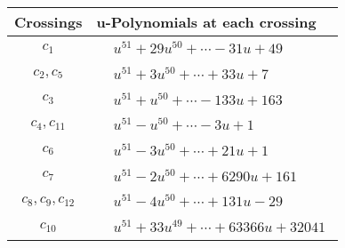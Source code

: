 \documentclass[1p]{elsarticle_modified}
\theoremstyle{definition}
\begin{document}
\begin{tabular}{m{50pt}|m{274pt}}
Crossings & \hspace{64pt}u-Polynomials at each crossing \\
\hline $$\begin{aligned}c_{1}\end{aligned}$$&$\begin{aligned}
&u^{51}+29 u^{50}+\cdots-31 u+49
\end{aligned}$\\
\hline $$\begin{aligned}c_{2},c_{5}\end{aligned}$$&$\begin{aligned}
&u^{51}+3 u^{50}+\cdots+33 u+7
\end{aligned}$\\
\hline $$\begin{aligned}c_{3}\end{aligned}$$&$\begin{aligned}
&u^{51}+u^{50}+\cdots-133 u+163
\end{aligned}$\\
\hline $$\begin{aligned}c_{4},c_{11}\end{aligned}$$&$\begin{aligned}
&u^{51}- u^{50}+\cdots-3 u+1
\end{aligned}$\\
\hline $$\begin{aligned}c_{6}\end{aligned}$$&$\begin{aligned}
&u^{51}-3 u^{50}+\cdots+21 u+1
\end{aligned}$\\
\hline $$\begin{aligned}c_{7}\end{aligned}$$&$\begin{aligned}
&u^{51}-2 u^{50}+\cdots+6290 u+161
\end{aligned}$\\
\hline $$\begin{aligned}c_{8},c_{9},c_{12}\end{aligned}$$&$\begin{aligned}
&u^{51}-4 u^{50}+\cdots+131 u-29
\end{aligned}$\\
\hline $$\begin{aligned}c_{10}\end{aligned}$$&$\begin{aligned}
&u^{51}+33 u^{49}+\cdots+63366 u+32041
\end{aligned}$\\
\hline
\end{tabular}\\~\\
\end{document}
